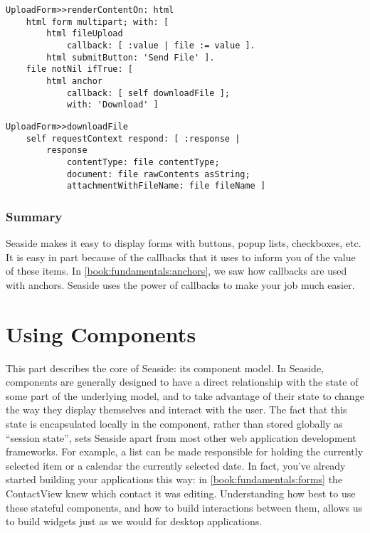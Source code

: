 \documentclass[a4paper,10pt,twoside]{book}
\newcommand{\ct}[1]{{\small\ttfamily\textup{#1}}}
\begin{document}
\begin{lstlisting}
UploadForm>>renderContentOn: html
    html form multipart; with: [
        html fileUpload
            callback: [ :value | file := value ].
        html submitButton: 'Send File' ].
    file notNil ifTrue: [
        html anchor
            callback: [ self downloadFile ];
            with: 'Download' ]
\end{lstlisting}

\begin{lstlisting}
UploadForm>>downloadFile
    self requestContext respond: [ :response |
        response
            contentType: file contentType;
            document: file rawContents asString;
            attachmentWithFileName: file fileName ]
\end{lstlisting}

\section{Summary}
\label{book:fundamentals:forms:formsummary}

Seaside makes it easy to display forms with buttons, popup lists, checkboxes, etc. It is easy in part because of the callbacks that it uses to inform you of the value of these items. In \autoref{book:fundamentals:anchors}, we saw how callbacks are used with anchors. Seaside uses the power of callbacks to make your job much easier.

\part{Using Components}
\label{book:components}

This part describes the core of Seaside: its component model. In Seaside, components are generally designed to have a direct relationship with the state of some part of the underlying model, and to take advantage of their state to change the way they display themselves and interact with the user. The fact that this state is encapsulated locally in the component, rather than stored globally as ``session state'', sets Seaside apart from most other web application development frameworks. For example, a list can be made responsible for holding the currently selected item or a calendar the currently selected date. In fact, you've already started building your applications this way: in \autoref{book:fundamentals:forms} the \ct{ContactView} knew which contact it was editing. Understanding how best to use these stateful components, and how to build interactions between them, allows us to build widgets just as we would for desktop applications.
\end{document}
